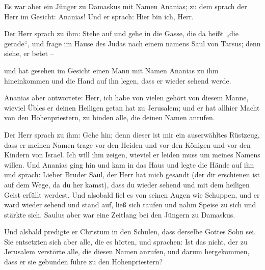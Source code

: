 Es war aber ein Jünger zu Damaskus mit Namen Ananias; zu
dem sprach der Herr im Gesicht: Ananias! Und er sprach: Hier bin ich,
Herr.

 Der Herr sprach zu ihm: Stehe auf und gehe in die Gasse,
die da heißt „die gerade``, und frage im Hause des Judas nach einem
namens Saul von Tarsus; denn siehe, er betet --

 und hat gesehen im Gesicht einen Mann mit Namen Ananias
zu ihm hineinkommen und die Hand auf ihn legen, dass er wieder sehend
werde.

 Ananias aber antwortete: Herr, ich habe von vielen
gehört von diesem Manne, wieviel Übles er deinen Heiligen getan hat zu
Jerusalem;  und er hat allhier Macht von den
Hohenpriestern, zu binden alle, die deinen Namen anrufen.

 Der Herr sprach zu ihm: Gehe hin; denn dieser ist mir
ein auserwähltes Rüstzeug, dass er meinen Namen trage vor den Heiden und
vor den Königen und vor den Kindern von Israel.  Ich will
ihm zeigen, wieviel er leiden muss um meines Namens willen.
 Und Ananias ging hin und kam in das Haus und legte die
Hände auf ihn und sprach: Lieber Bruder Saul, der Herr hat mich gesandt
(der dir erschienen ist auf dem Wege, da du her kamst), dass du wieder
sehend und mit dem heiligen Geist erfüllt werdest.  Und
alsobald fiel es von seinen Augen wie Schuppen, und er ward wieder
sehend  und stand auf, ließ sich taufen und nahm Speise
zu sich und stärkte sich. Saulus aber war eine Zeitlang bei den Jüngern
zu Damaskus.

 Und alsbald predigte er Christum in den Schulen, dass
derselbe Gottes Sohn sei.  Sie entsetzten sich aber alle,
die es hörten, und sprachen: Ist das nicht, der zu Jerusalem verstörte
alle, die diesen Namen anrufen, und darum hergekommen, dass er sie
gebunden führe zu den Hohenpriestern?

